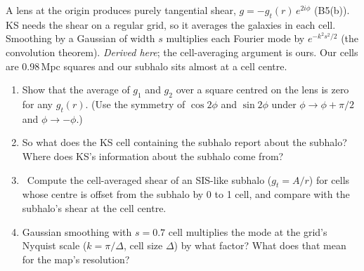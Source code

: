 \begin{given}
A lens at the origin produces purely tangential shear, $g = -g_t(r)\,e^{2i\phi}$ (B5(b)). KS needs the shear on a
regular grid, so it averages the galaxies in each cell. Smoothing by a Gaussian of width $s$ multiplies each Fourier
mode by $e^{-k^2s^2/2}$ (the convolution theorem). \emph{Derived here}; the cell-averaging argument is ours. Our cells
are 0.98\,Mpc squares and our subhalo sits almost at a cell centre.
\end{given}


\begin{enumerate}
  \item Show that the average of $g_1$ and $g_2$ over a square centred on the lens is zero for any $g_t(r)$.
    (Use the symmetry of $\cos2\phi$ and $\sin2\phi$ under $\phi \to \phi + \pi/2$ and $\phi \to -\phi$.)
  \item So what does the KS cell containing the subhalo report about the subhalo? Where does KS's information about
    the subhalo come from?
  \item \py\ Compute the cell-averaged shear of an SIS-like subhalo ($g_t = A/r$) for cells whose centre is offset from
    the subhalo by 0 to 1 cell, and compare with the subhalo's shear at the cell centre.
  \item Gaussian smoothing with $s = 0.7$ cell multiplies the mode at the grid's Nyquist scale ($k = \pi/\Delta$, cell
    size $\Delta$) by what factor? What does that mean for the map's resolution?
\end{enumerate}


